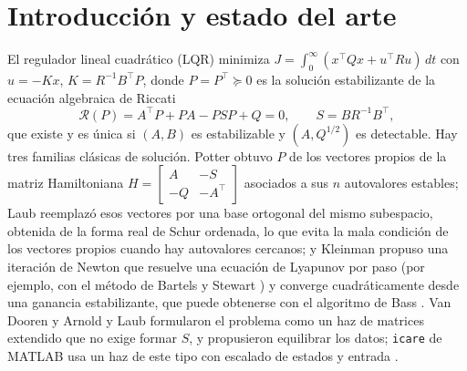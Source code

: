 \documentclass[11pt,a4paper]{article}
\begin{document}
\section{Introducción y estado del arte}
El regulador lineal cuadrático (LQR) minimiza $J=\int_0^\infty (x^\top Qx+u^\top Ru)\,dt$ con $u=-Kx$,
$K=R^{-1}B^\top P$, donde $P=P^\top\succeq0$ es la solución estabilizante de la ecuación algebraica de Riccati
\begin{equation}
\mathcal R(P)=A^\top P+PA-PSP+Q=0,\qquad S=BR^{-1}B^\top ,\label{eq:are}
\end{equation}
que existe y es única si $(A,B)$ es estabilizable y $(A,Q^{1/2})$ es detectable. Hay tres familias clásicas de
solución. Potter \cite{potter1966} obtuvo $P$ de los vectores propios de la matriz Hamiltoniana
$H=\left[\begin{smallmatrix}A&-S\\-Q&-A^\top\end{smallmatrix}\right]$ asociados a sus $n$ autovalores estables;
Laub \cite{laub1979} reemplazó esos vectores por una base ortogonal del mismo subespacio, obtenida de la forma real
de Schur ordenada, lo que evita la mala condición de los vectores propios cuando hay autovalores cercanos;
y Kleinman \cite{kleinman1968} propuso una iteración de Newton que resuelve una ecuación de Lyapunov por paso
(por ejemplo, con el método de Bartels y Stewart \cite{bartels1972}) y converge cuadráticamente desde una
ganancia estabilizante, que puede obtenerse con el algoritmo de Bass \cite{armstrong1975}. Van Dooren
\cite{vandooren1981} y Arnold y Laub \cite{arnold1984} formularon el problema como un haz de matrices
extendido que no exige formar $S$, y propusieron equilibrar los datos; \texttt{icare} de MATLAB usa un haz de
este tipo con escalado de estados y entrada \cite{mathworks2026}.
\end{document}
